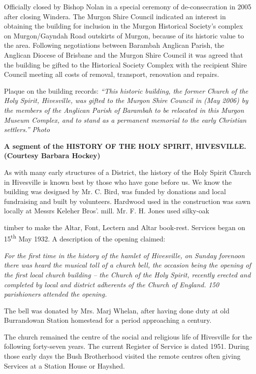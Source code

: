 Officially closed by Bishop Nolan in a special ceremony of
de-consecration in 2005 after closing Windera. The Murgon Shire Council
indicated an interest in obtaining the building for inclusion in the
Murgon Historical Society's complex on Murgon/Gayndah Road outskirts of
Murgon, because of its historic value to the area. Following
negotiations between Barambah Anglican Parish, the Anglican Diocese of
Brisbane and the Murgon Shire Council it was agreed that the building be
gifted to the Historical Society Complex with the recipient Shire
Council meeting all costs of removal, transport, renovation and repairs.

Plaque on the building records: \emph{``This historic building, the
former Church of the Holy Spirit, Hivesville, was gifted to the Murgon
Shire Council in (May 2006) by the members of the Anglican Parish of
Barambah to be relocated in this Murgon Museum Complex, and to stand as
a permanent memorial to the early Christian settlers.'' Photo}

\textbf{A segment of the HISTORY OF THE HOLY SPIRIT, HIVESVILLE.
(Courtesy Barbara Hockey)}

As with many early structures of a District, the history of the Holy
Spirit Church in Hivesville is known best by those who have gone before
us. We know the building was designed by Mr. C. Bird, was funded by
donations and local fundraising and built by volunteers. Hardwood used
in the construction was sawn locally at Messrs Keleher Bros'. mill. Mr.
F. H. Jones used silky-oak

timber to make the Altar, Font, Lectern and Altar book-rest. Services
began on 15\textsuperscript{th} May 1932. A description of the opening
claimed:

\emph{For the first time in the history of the hamlet of Hivesville, on
Sunday forenoon there was heard the musical toll of a church bell, the
occasion being the opening of the first local church building -- the
Church of the Holy Spirit, recently erected and completed by local and
district adherents of the Church of England. 150 parishioners attended
the opening.}

The bell was donated by Mrs. Marj Whelan, after having done duty at old
Burrandowan Station homestead for a period approaching a century.

The church remained the centre of the social and religious life of
Hivesville for the following forty-seven years. The current Register of
Service is dated 1951. During those early days the Bush Brotherhood
visited the remote centres often giving Services at a Station House or
Hayshed.

